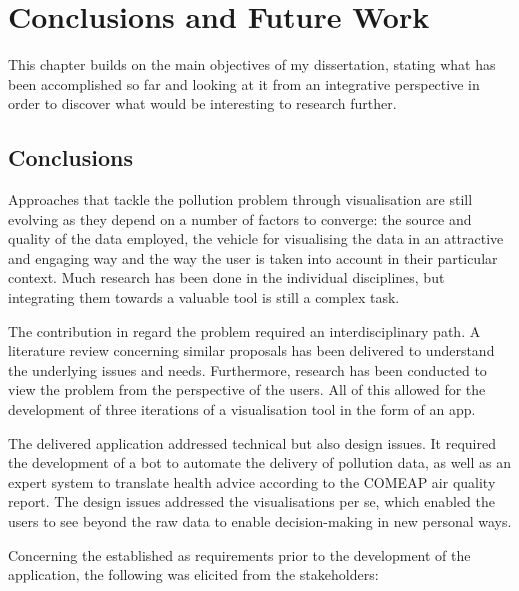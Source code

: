 \chapter{Conclusions and Future Work}
This chapter builds on the main objectives of my dissertation, stating what has been accomplished so far and  looking at it from an integrative perspective in order to discover what would be interesting to research further. 

\section{Conclusions}

Approaches that tackle the pollution problem through visualisation are still evolving as they depend on a number of factors to converge: the source and quality of the data employed, the vehicle for visualising the data in an attractive and engaging way and the way the user is taken into account in their particular context. Much research has been done in the individual disciplines, but integrating them towards a valuable tool is still a complex task.

The contribution in regard the problem required an interdisciplinary path. A literature review concerning similar proposals has been delivered to understand the underlying issues and needs. Furthermore, research has been conducted to view the problem from the perspective of the users. All of this allowed for the development of three iterations of a visualisation tool in the form of an app.

The delivered application addressed technical but also design issues. It required the development of a bot to automate the delivery of pollution data, as well as an expert system to translate health advice according to the COMEAP air quality report. The design issues addressed the visualisations per se, which enabled the users to see beyond the raw data to enable decision-making in new personal ways. 

Concerning the established as requirements prior to the development of the application, the following was elicited from the stakeholders: 

